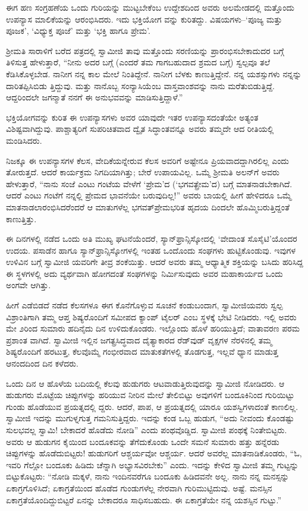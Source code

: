 ಈಗ ಹಣ ಸಂಗ್ರಹಣೆಯ ಒಂದು ಗುರಿಯನ್ನು ಮುಟ್ಟಬೇಕೆಂಬ ಉದ್ದೇಶದಿಂದ ಅವರು ಅಲಮೇಡದಲ್ಲಿ ಮತ್ತೊಂದು ಉಪನ್ಯಾಸ ಮಾಲಿಕೆಯನ್ನು ಆರಂಭಿಸಿದರು. ಇದು ಭಕ್ತಿಯೋಗ ವನ್ನು ಕುರಿತದ್ದು. ವಿಷಯಗಳು–‘ಪೂಜ್ಯ ಮತ್ತು ಪೂಜಕ’, ‘ವಿಧ್ಯುಕ್ತ ಪೂಜೆ’ ಮತ್ತು ‘ಭಕ್ತಿ ಹಾಗೂ ಪ್ರೇಮ’.

ಶ್ರೀಮತಿ ಸಾರಾಳಿಗೆ ಬರೆದ ಪತ್ರದಲ್ಲಿ ಸ್ವಾಮೀಜಿ ತಾವು ಮತ್ತೊಂದು ಸರಣಿಯನ್ನು ಪ್ರಾರಂಭಿಸಬೇಕಾದುದರ ಬಗ್ಗೆ ತಿಳಿಸುತ್ತ ಹೇಳುತ್ತಾರೆ, “ನೀನು ಅದರ ಬಗ್ಗೆ (ಎಂದರೆ ತಮ ಗಾಗಬಹುದಾದ ಶ್ರಮದ ಬಗ್ಗೆ) ಸ್ವಲ್ಪವೂ ತಲೆ ಕೆಡಿಸಿಕೊಳ್ಳಬೇಡ. ನಾನೀಗ ನನ್ನ ಕಾಲ ಮೇಲೆ ನಿಂತಿದ್ದೇನೆ. ನಾನೀಗ ಬೆಳಕು ಕಾಣುತ್ತಿದ್ದೇನೆ. ನನ್ನ ಯಶಸ್ಸುಗಳು ನನ್ನನ್ನು ದಾರಿತಪ್ಪಿಸಿಬಿಡು ತ್ತಿದ್ದುವು. ಮತ್ತು ನಾನೊಬ್ಬ ಸಂನ್ಯಾಸಿಯೆಂಬ ವಾಸ್ತವಾಂಶವನ್ನು ನಾನು ಮರೆತುಬಿಡುತ್ತಿದ್ದೆ. ಆದ್ದರಿಂದಲೇ ಜಗನ್ಮಾತೆ ನನಗೆ ಈ ಅನುಭವವನ್ನು ಮಾಡಿಸುತ್ತಿದ್ದಾಳೆ.”

ಭಕ್ತಿಯೋಗವನ್ನು ಕುರಿತ ಈ ಉಪನ್ಯಾಸಗಳು ಅವರ ಯಾವುದೇ ಇತರ ಉಪನ್ಯಾಸದಂತೆಯೇ ಅತ್ಯಂತ ವಿಶಿಷ್ಟವಾಗಿದ್ದುವು. ಪಾಶ್ಚಾತ್ಯರಿಗೆ ಸುಪರಿಚಿತವಾದ ದ್ವೈತ ಸಿದ್ಧಾಂತವನ್ನೂ ಅವರು ತಮ್ಮದೇ ಆದ ರೀತಿಯಲ್ಲಿ ಮಂಡಿಸಿದರು.

ನಿಜಕ್ಕೂ ಈ ಉಪನ್ಯಾಸಗಳ ಕೆಲಸ, ವೇದಿಕೆಯನ್ನೇರುವ ಕೆಲಸ ಅವರಿಗೆ ಅಷ್ಟೇನೂ ಪ್ರಿಯವಾದದ್ದಾಗಿರಲಿಲ್ಲ ಎಂದು ತೋರುತ್ತದೆ. ಆದರೆ ಕಾರ್ಯಕ್ರಮ ನಿಗದಿಯಾಗಿತ್ತು; ಬೇರೆ ಉಪಾಯವಿಲ್ಲ. ಒಮ್ಮೆ ಶ್ರೀಮತಿ ಅಲನ್​ಗೆ ಅವರು ಹೇಳುತ್ತಾರೆ, “ನಾನು ಸಂಜೆ ಎಂಟು ಗಂಟೆಯ ವೇಳೆಗೆ ‘ಪ್ರೇಮ’ದ (‘ಭಗವತ್ಪ್ರೇಮ’ದ) ಬಗ್ಗೆ ಮಾತನಾಡಬೇಕಾಗಿದೆ. ಆದರೆ ಎಂಟು ಗಂಟೆಗೆ ನನ್ನಲ್ಲಿ ಪ್ರೇಮದ ಭಾವನೆಯೇ ಬರುವುದಿಲ್ಲ!” ಅವರು ಬಾಯಲ್ಲಿ ಹೀಗೆ ಹೇಳಿದರೂ ಒಮ್ಮೆ ಮಾತನಾಡಲಾರಂಭಿಸಿದರೆಂದರೆ ಆ ಮಾತುಗಳೆಲ್ಲ ಭಗವತ್​ಪ್ರೇಮಭರಿತ ಹೃದಯ ದಿಂದಲೇ ಹೊಮ್ಮಿಬರುತ್ತಿದ್ದಂತೆ ಕಾಣುತ್ತಿತ್ತು.

ಈ ದಿನಗಳಲ್ಲಿ ನಡೆದ ಒಂದು ಅತಿ ಮುಖ್ಯ ಘಟನೆಯೆಂದರೆ, ಸ್ಯಾನ್​ಫ್ರಾನ್ಸಿಸ್ಕೋದಲ್ಲಿ ‘ವೇದಾಂತ ಸೊಸೈಟಿ’ಯೊಂದರ ಉದಯ. ಪಸಾಡೆನ ಹಾಗೂ ಸ್ಯಾನ್​ಫ್ರಾನ್ಸಿಸ್ಕೋಗಳಲ್ಲಿ ಇಂತಹ ಒಂದೊಂದು ಸಂಘಗಳು ಹುಟ್ಟಿಕೊಂಡುವು. ಇವುಗಳ ಉಳಿವಿನ ಬಗ್ಗೆ ಸ್ವಾಮೀಜಿ ಯವರಿಗೇ ತೀವ್ರ ಶಂಕೆಯಿತ್ತು. ಆದರೆ ಅವರು ತಮ್ಮ ಆಧ್ಯಾತ್ಮಿಕ ಶಕ್ತಿಯನ್ನು ಬಸಿದು ಹರಿಸಿದ್ದ ಈ ಸ್ಥಳಗಳಲ್ಲಿ ಅದು ವ್ಯರ್ಥವಾಗಿ ಹೋಗದಂತೆ ಸಂಘಗಳನ್ನು ನಿರ್ಮಿಸುವುದು ಅವರ ಮಹಾಕಾರ್ಯದ ಒಂದು ಅಂಗವೇ ಆಗಿತ್ತು.

ಹೀಗೆ ಎಡೆಬಿಡದೆ ನಡೆದ ಕೆಲಸಗಳೂ ಈಗ ಕೊನೆಗೊಳ್ಳುವ ಸೂಚನೆ ಕಂಡುಬಂದಾಗ, ಸ್ವಾಮೀಜಿಯವರು ಸ್ವಲ್ಪ ವಿಶ್ರಾಂತಿಗಾಗಿ ತಮ್ಮ ಆಪ್ತ ಶಿಷ್ಯರೊಂದಿಗೆ ಸಮೀಪದ ಕ್ಯಾಂಪ್ ಟೈಲರ್ ಎಂಬ ಸ್ಥಳಕ್ಕೆ ಭೇಟಿ ನೀಡಿದರು. ಇಲ್ಲಿ ಅವರು ಮೇ ೨ರಿಂದ ಸುಮಾರು ಹದಿನೈದು ದಿನ ಉಳಿದುಕೊಂಡರು. ಇಲ್ಲೊಂದು ಹೊಳೆ ಹರಿಯುತ್ತಿದೆ; ವಾತಾವರಣ ಪರಮ ಪ್ರಶಾಂತ ವಾಗಿದೆ. ಸ್ವಾಮೀಜಿ ಇಲ್ಲಿನ ಜಗತ್ಪ್ರಸಿದ್ಧವಾದ ದೈತ್ಯಾಕಾರದ ರೆಡ್​ವುಡ್ ವೃಕ್ಷಗಳ ನೆರಳಿನಲ್ಲಿ ತಮ್ಮ ಶಿಷ್ಯರೊಂದಿಗೆ ಹರಟುತ್ತ, ಕೆಲವೊಮ್ಮೆ ಗಂಭೀರವಾದ ಮಾತುಕತೆಗಳಲ್ಲಿ ತೊಡಗುತ್ತ, ಇಲ್ಲವೆ ಧ್ಯಾನ ಮಾಡುತ್ತ ಆನಂದದಿಂದ ದಿನ ಕಳೆದರು.

ಒಂದು ದಿನ ಆ ಹೊಳೆಯ ಬದಿಯಲ್ಲಿ ಕೆಲವು ಹುಡುಗರು ಆಟವಾಡುತ್ತಿರುವುದನ್ನು ಸ್ವಾಮೀಜಿ ನೋಡಿದರು. ಆ ಹುಡುಗರು ಮೊಟ್ಟೆಯ ಚಿಪ್ಪುಗಳನ್ನು ಹರಿಯುವ ನೀರಿನ ಮೇಲೆ ತೇಲಿಬಿಟ್ಟು ಅವುಗಳಿಗೆ ಬಂದೂಕಿನಿಂದ ಗುರಿಯಿಟ್ಟು ಗುಂಡು ಹೊಡೆಯುವ ಪ್ರಯತ್ನದಲ್ಲಿ ದ್ದರು. ಆದರೆ, ಪಾಪ, ಆ ಪ್ರಯತ್ನದಲ್ಲಿ ಯಾರೂ ಯಶಸ್ವಿಗಳಾದಂತೆ ಕಾಣಲಿಲ್ಲ. ಸ್ವಾಮೀಜಿ ಇದನ್ನು ಮುಗುಳ್ನಗುತ್ತ ಗಮನಿಸುತ್ತಿದ್ದರು. ಇದನ್ನು ಕಂಡ ಒಬ್ಬ ಹುಡುಗ, “ಅದು ನೀವಂದು ಕೊಂಡಷ್ಟು ಸುಲಭವಲ್ಲ ಸ್ವಾಮಿ! ಬೇಕಾದರೆ ಹೊಡೆದು ನೋಡಿ” ಎಂದು ಪಂಥವೊಡ್ಡಿದ. ಸ್ವಾಮೀಜಿ ಪಂಥಕ್ಕೆ ನಿಂತೇಬಿಟ್ಟರು. ಅವರು ಆ ಹುಡುಗನ ಕೈಯಿಂದ ಬಂದೂಕವನ್ನು ತೆಗೆದುಕೊಂಡು ಒಂದೇ ಸಮನೆ ಸುಮಾರು ಹತ್ತು ಹನ್ನೆರಡು ಚಿಪ್ಪುಗಳನ್ನು ಹೊಡೆದುಬಿಟ್ಟರು! ಹುಡುಗರಿಗೆ ಆಶ್ಚರ್ಯವೋ ಆಶ್ಚರ್ಯ. ಆದರೆ ಅವರೆಲ್ಲ ಮಾತನಾಡಿಕೊಂಡರು, “ಓ, ಇವರಿ ಗೆಲ್ಲೋ ಬಂದೂಕು ಹಿಡಿದು ಚೆನ್ನಾಗಿ ಅಭ್ಯಾಸವಿರಬೇಕು” ಎಂದು. ಇದನ್ನು ಕೇಳಿದ ಸ್ವಾಮೀಜಿ ತಮ್ಮ ಗುಟ್ಟನ್ನು ಬಿಟ್ಟುಕೊಟ್ಟರು: “ನೋಡಿ ಮಕ್ಕಳೆ, ನಾನು ಇಂದಿನವರೆಗೂ ಬಂದೂಕು ಹಿಡಿದವನೇ ಅಲ್ಲ. ನಾನು ನನ್ನ ಮನಸ್ಸನ್ನು ಏಕಾಗ್ರಗೊಳಿಸಿದೆ; ಏಕಾಗ್ರತೆಯಿಂದ ಹೊಡೆದ ಗುಂಡುಗಳೆಲ್ಲ ನೇರವಾಗಿ ಗುರಿಮುಟ್ಟಿದುವು. ಅಷ್ಟೆ. ಮನಸ್ಸಿನ ಏಕಾಗ್ರತೆಯೊಂದಿದ್ದುಬಿಟ್ಟರೆ ಏನನ್ನು ಬೇಕಾದರೂ ಸಾಧಿಸಬಹುದು. ಈ ಏಕಾಗ್ರತೆಯೇ ನನ್ನ ಯಶಸ್ಸಿನ ಗುಟ್ಟು.”

